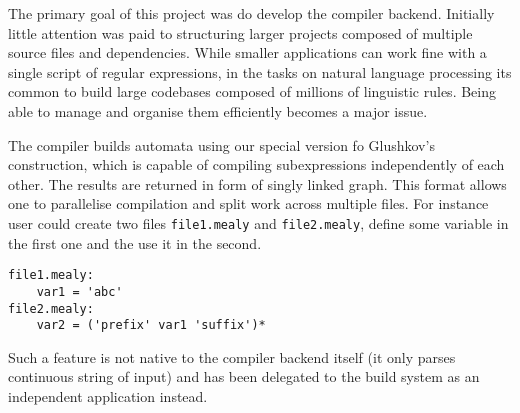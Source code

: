 The primary goal of this project was do develop the compiler backend. 
Initially little attention was paid to structuring larger projects composed of multiple source files and dependencies. While smaller applications can work fine with a single script of regular expressions, in the tasks on natural language processing its common to build large codebases composed of millions of linguistic rules. Being able to manage and organise them efficiently becomes a major issue. 

The compiler builds automata using our special version fo Glushkov's construction, which is capable of compiling subexpressions independently of each other. The results are returned in form of singly linked graph. This format allows one to parallelise compilation and split work across multiple files. For instance user could create two files \texttt{file1.mealy} and \texttt{file2.mealy}, define some variable in the first one and the use it in the second.
\begin{lstlisting}
file1.mealy:
    var1 = 'abc'
file2.mealy:
    var2 = ('prefix' var1 'suffix')*
\end{lstlisting}
Such a feature is not native to the compiler backend itself (it only parses continuous string of input) and has been delegated to the build system as an independent application instead. 

